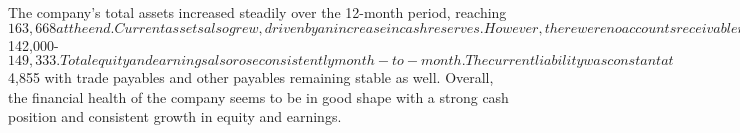 The company's total assets increased steadily over the 12-month period, reaching $163,668 at the end. Current assets also grew, driven by an increase in cash reserves. However, there were no accounts receivable recorded throughout the year. Fixed assets remained stable but high at $142,000-$149,333. Total equity and earnings also rose consistently month-to-month. The current liability was constant at $4,855 with trade payables and other payables remaining stable as well. Overall, the financial health of the company seems to be in good shape with a strong cash position and consistent growth in equity and earnings.